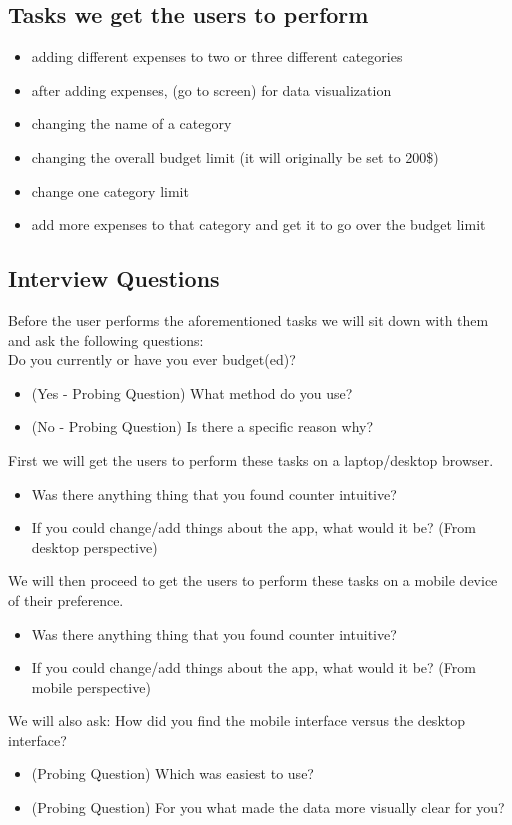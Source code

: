 \documentclass{chi2011}
\begin{document}
	\subsection{Tasks we get the users to perform}
	\begin{itemize}
		\item adding different expenses to two or three different categories
		\item after adding expenses, (go to screen) for data visualization
		\item  changing the name of a category
		\item  changing the overall budget limit (it will originally be set to 200\$)
		\item  change one category limit
		\item  add more expenses to that category and get it to go over the budget limit
	\end{itemize}
	\subsection{Interview Questions}
	Before the user performs the aforementioned tasks we will sit down with them and ask the following 
	questions:\\
	Do you currently or have you ever budget(ed)?
			\begin{itemize}
				\item (Yes - Probing Question) What method do you use?
				\item (No - Probing Question) Is there a specific reason why?
			\end{itemize}
	First we will get the users to perform these tasks on a laptop/desktop browser. 
	\begin{itemize}
		\item Was there anything thing that you found counter intuitive?
		\item If you could change/add things about the app, what would it be? (From desktop perspective)
	\end{itemize}
	We will then proceed to get the users to perform these tasks on a mobile device of their 
	preference.
	\begin{itemize}
		\item Was there anything thing that you found counter intuitive?
		\item If you could change/add things about the app, what would it be? (From mobile perspective)
	\end{itemize}
	We will also ask:
	How did you find the mobile interface versus the desktop interface?
	\begin{itemize}
		\item (Probing Question) Which was easiest to use?
		\item (Probing Question) For you what made the data more visually clear for you?
	\end{itemize}
		
\end{document}
